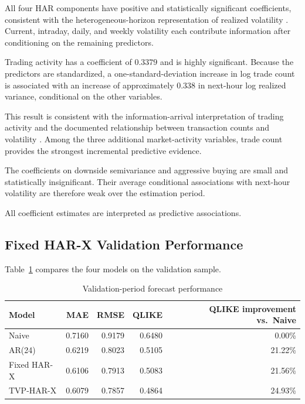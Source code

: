 All four HAR components have positive and statistically
significant coefficients, consistent with the
heterogeneous-horizon representation of realized volatility
\citep{corsi2009}. Current, intraday, daily, and weekly
volatility each contribute information after conditioning on
the remaining predictors.

Trading activity has a coefficient of \(0.3379\) and is highly
significant. Because the predictors are standardized, a
one-standard-deviation increase in log trade count is
associated with an increase of approximately \(0.338\) in
next-hour log realized variance, conditional on the other
variables.

This result is consistent with the information-arrival
interpretation of trading activity \citep{clark1973} and the
documented relationship between transaction counts and
volatility \citep{jones1994}. Among the three additional
market-activity variables, trade count provides the strongest
incremental predictive evidence.

The coefficients on downside semivariance and aggressive
buying are small and statistically insignificant. Their
average conditional associations with next-hour volatility are
therefore weak over the estimation period.

All coefficient estimates are interpreted as predictive
associations.

\subsection{Fixed HAR-X Validation Performance}

Table~\ref{tab:validation-model-comparison} compares the four
models on the validation sample.

\begin{table}[H]
\centering
\caption{Validation-period forecast performance}
\label{tab:validation-model-comparison}
\begin{tabular}{lrrrr}
\toprule
Model
& MAE
& RMSE
& QLIKE
& QLIKE improvement vs.\ Naive \\
\midrule
Naive
& 0.7160
& 0.9179
& 0.6480
& 0.00\% \\

AR(24)
& 0.6219
& 0.8023
& 0.5105
& 21.22\% \\

Fixed HAR-X
& 0.6106
& 0.7913
& 0.5083
& 21.56\% \\

TVP-HAR-X
& 0.6079
& 0.7857
& 0.4864
& 24.93\% \\
\bottomrule
\end{tabular}
\end{table}

